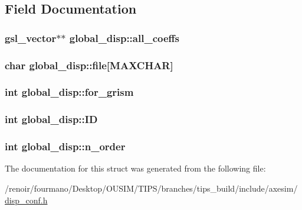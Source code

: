 \subsection{Field Documentation}
\hypertarget{structglobal__disp_a1af1bf0f9fbdc4a21997e3d0c5a64fd1}{
\subsubsection[{all\_\-coeffs}]{\setlength{\rightskip}{0pt plus 5cm}gsl\_\-vector$\ast$$\ast$ {\bf global\_\-disp::all\_\-coeffs}}}
\label{structglobal__disp_a1af1bf0f9fbdc4a21997e3d0c5a64fd1}
\hypertarget{structglobal__disp_ae67de53cf4c491ab0347abffeaa18f8d}{
\subsubsection[{file}]{\setlength{\rightskip}{0pt plus 5cm}char {\bf global\_\-disp::file}\mbox{[}MAXCHAR\mbox{]}}}
\label{structglobal__disp_ae67de53cf4c491ab0347abffeaa18f8d}
\hypertarget{structglobal__disp_a44606b1a9c84c6c126b0cf4a35365246}{
\subsubsection[{for\_\-grism}]{\setlength{\rightskip}{0pt plus 5cm}int {\bf global\_\-disp::for\_\-grism}}}
\label{structglobal__disp_a44606b1a9c84c6c126b0cf4a35365246}
\hypertarget{structglobal__disp_a4606b56e1a2d862d42b339a184ca1f4b}{
\subsubsection[{ID}]{\setlength{\rightskip}{0pt plus 5cm}int {\bf global\_\-disp::ID}}}
\label{structglobal__disp_a4606b56e1a2d862d42b339a184ca1f4b}
\hypertarget{structglobal__disp_a8a8e283bb77c336aa4cf6080c7582f38}{
\subsubsection[{n\_\-order}]{\setlength{\rightskip}{0pt plus 5cm}int {\bf global\_\-disp::n\_\-order}}}
\label{structglobal__disp_a8a8e283bb77c336aa4cf6080c7582f38}


The documentation for this struct was generated from the following file:\begin{DoxyCompactItemize}
\item 
/renoir/fourmano/Desktop/OUSIM/TIPS/branches/tips\_\-build/include/axesim/\hyperlink{disp__conf_8h}{disp\_\-conf.h}\end{DoxyCompactItemize}
